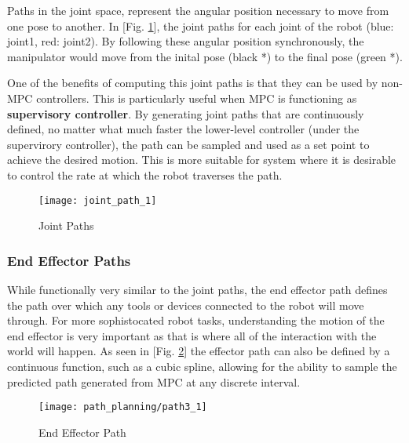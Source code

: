 \documentclass[journal]{IEEEtran}
\begin{document}
Paths in the joint space, represent the angular position necessary to move from one pose to another. In [Fig. \ref{fig:joint_path}], the joint paths for each joint of the robot (blue: joint1, red: joint2). By following these angular position synchronously, the manipulator would move from the inital pose (black *) to the final pose (green *).

One of the benefits of computing this joint paths is that they can be used by non-MPC controllers. This is particularly useful when MPC is functioning as \textbf{supervisory controller}. By generating joint paths that are continuously defined, no matter what much faster the lower-level controller (under the supervirory controller), the path can be sampled and used as a set point to achieve the desired motion. This is more suitable for system where it is desirable to control the rate at which the robot traverses the path.

\begin{figure}[ht]
    \centering
    \texttt{[image: joint\_path\_1]}
    \caption{Joint Paths }%
    \label{fig:joint_path}%
\end{figure}

\subsubsection{End Effector Paths }

While functionally very similar to the joint paths, the end effector path defines the path over which any tools or devices connected to the robot will move through. For more sophistocated robot tasks, understanding the motion of the end effector is very important as that is where all of the interaction with the world will happen. As seen in [Fig. \ref{fig:effector_path}] the effector path can also be defined by a continuous function, such as a cubic spline, allowing for the ability to sample the predicted path generated from MPC at any discrete interval.


\begin{figure}[ht]
    \centering
    \texttt{[image: path\_planning/path3\_1]}
    \caption{End Effector Path}%
    \label{fig:effector_path}%
\end{figure}
\end{document}

